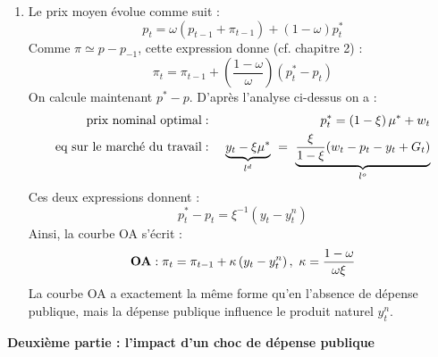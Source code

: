 \documentclass[a4paper,11pt]{article}
\begin{document}
\begin{enumerate}

\item Le prix moyen \'{e}volue comme suit : 
\begin{equation*}
p_{t}=\omega \left( p_{t-1}+\pi _{t-1}\right) +\left( 1-\omega \right)
p_{t}^{\ast }
\end{equation*}%
Comme $\pi \simeq p-p_{-1}$, cette expression donne (cf. chapitre 2) :%
\begin{equation*}
\pi _{t}=\pi _{t-1}+\left( \frac{1-\omega }{\omega }\right) \left(
p_{t}^{\ast }-p_{t}\right)
\end{equation*}%
On calcule maintenant $p^{\ast }-p$. D'apr\`{e}s l'analyse ci-dessus on a :%
\begin{eqnarray*}
\text{prix nominal optimal} &:&p_{t}^{\ast }=\left( 1-\xi \right) \mu ^{\ast
}+w_{t} \\
\text{eq sur le march\'{e} du travail} &:&\ \underset{l^{d}}{\underbrace{%
y_{t}-\xi \mu ^{\ast }}}\ =\ \underset{l^{o}}{\underbrace{\frac{\xi }{1-\xi }%
(w_{t}-p_{t}-y_{t}+G_{t})}}
\end{eqnarray*}%
Ces deux expressions donnent :%
\begin{equation*}
p_{t}^{\ast }-p_{t}=\xi ^{-1}\left( y_{t}-y_{t}^{n}\right)
\end{equation*}%
Ainsi, la courbe OA s'\'{e}crit :%
\begin{equation*}
\text{\textbf{OA}}:\pi _{t}=\pi _{t-1}+\kappa \left( y_{t}-y_{t}^{n}\right)
,\ \kappa =\frac{1-\omega }{\omega \xi }
\end{equation*}%
La courbe OA a exactement la m\^{e}me forme qu'en l'absence de d\'{e}pense
publique, mais la d\'{e}pense publique influence le produit naturel $%
y_{t}^{n}$.
\end{enumerate}

\bigskip

\noindent \textbf{Deuxi\`{e}me partie : l'impact d'un choc de d\'{e}pense
publique}
\end{document}
